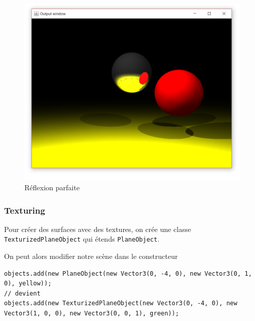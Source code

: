 \begin{figure}[H]
	\caption{\label{10_3} Réflexion parfaite}
	\centering
	\includegraphics[scale = 0.4]{10_3.png}
\end{figure}

\subsubsection{Texturing}

Pour créer des surfaces avec des textures, on crée une classe \texttt{TexturizedPlaneObject} qui étends \texttt{PlaneObject}.


On peut alors modifier notre scène dans le constructeur

\begin{lstlisting}
objects.add(new PlaneObject(new Vector3(0, -4, 0), new Vector3(0, 1, 0), yellow));
// devient
objects.add(new TexturizedPlaneObject(new Vector3(0, -4, 0), new Vector3(1, 0, 0), new Vector3(0, 0, 1), green));
\end{lstlisting}

